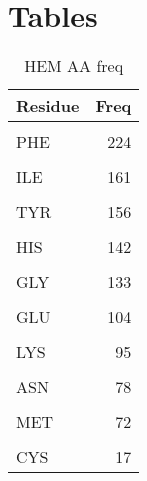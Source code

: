 \chapter{Tables}
\begin{table}
	\caption{HEM AA freq}
	\label{tbl:HEM_AAfreq}\centering
	\centering
	\begin{tabular}{lr}
		\toprule
		Residue & Freq\\
		\midrule
		\cellcolor{gray!6}{LEU} & \cellcolor{gray!6}{261}\\
		PHE & 224\\
		\cellcolor{gray!6}{ALA} & \cellcolor{gray!6}{188}\\
		ILE & 161\\
		\cellcolor{gray!6}{VAL} & \cellcolor{gray!6}{158}\\
		\addlinespace
		TYR & 156\\
		\cellcolor{gray!6}{ARG} & \cellcolor{gray!6}{146}\\
		HIS & 142\\
		\cellcolor{gray!6}{THR} & \cellcolor{gray!6}{142}\\
		GLY & 133\\
		\addlinespace
		\cellcolor{gray!6}{SER} & \cellcolor{gray!6}{129}\\
		GLU & 104\\
		\cellcolor{gray!6}{ASP} & \cellcolor{gray!6}{99}\\
		LYS & 95\\
		\cellcolor{gray!6}{PRO} & \cellcolor{gray!6}{84}\\
		\addlinespace
		ASN & 78\\
		\cellcolor{gray!6}{GLN} & \cellcolor{gray!6}{78}\\
		MET & 72\\
		\cellcolor{gray!6}{TRP} & \cellcolor{gray!6}{60}\\
		CYS & 17\\
		\bottomrule
	\end{tabular}
\end{table}